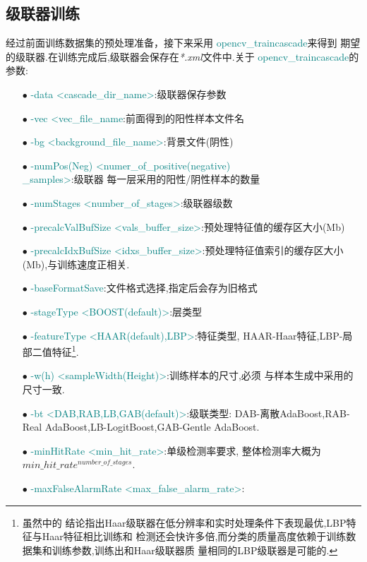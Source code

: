 \documentclass[10pt,technote]{IEEEtran}
\begin{document}
\subsection{级联器训练}
经过前面训练数据集的预处理准备，接下来采用
\textcolor{teal}{opencv\_traincascade}来得到
期望的级联器.在训练完成后,级联器会保存在\textit{*.xml}文件中.关于
\textcolor{teal}{opencv\_traincascade}的参数:
\begin{enumerate}
\item[$\bullet$]\textcolor{teal}{-data <cascade\_dir\_name>}:级联器保存参数
\item[$\bullet$]\textcolor{teal}{-vec <vec\_file\_name}:前面得到的阳性样本文件名
\item[$\bullet$]\textcolor{teal}{-bg <background\_file\_name>}:背景文件(阴性)
\item[$\bullet$]
\textcolor{teal}{-numPos(Neg) <numer\_of\_positive(negative)\\\_samples>}:级联器
每一层采用的阳性/阴性样本的数量
\item[$\bullet$]\textcolor{teal}{-numStages <number\_of\_stages>}:级联器级数
\item[$\bullet$]\textcolor{teal}{-precalcValBufSize <vals\_buffer\_size>}:预处理特征值的缓存区大小(Mb)
\item[$\bullet$]\textcolor{teal}{-precalcIdxBufSize <idxs\_buffer\_size>}:预处理特征值索引的缓存区大小(Mb),与训练速度正相关.
\item[$\bullet$]\textcolor{teal}{-baseFormatSave}:文件格式选择,指定后会存为旧格式
\item[$\bullet$]\textcolor{teal}{-stageType <BOOST(default)>}:层类型
\item[$\bullet$]\textcolor{teal}{-featureType <HAAR(default),LBP>}:特征类型,
HAAR-Haar特征,LBP\cite{bib6}-局部二值特征\footnote{虽然\cite{bib1}中的
结论指出Haar级联器在低分辨率和实时处理条件下表现最优,LBP特征与Haar特征相比训练和
检测还会快许多倍,而分类的质量高度依赖于训练数据集和训练参数,训练出和Haar级联器质
量相同的LBP级联器是可能的.}.
\item[$\bullet$]\textcolor{teal}{-w(h) <sampleWidth(Height)>}:训练样本的尺寸,必须
与样本生成中采用的尺寸一致.
\item[$\bullet$]\textcolor{teal}{-bt <{DAB,RAB,LB,GAB(default)}>}:级联类型:
DAB-离散AdaBoost,RAB-Real AdaBoost,LB-LogitBoost,GAB-Gentle AdaBoost.
\item[$\bullet$]\textcolor{teal}{-minHitRate <min\_hit\_rate>}:单级检测率要求,
整体检测率大概为$min\_hit\_rate^{number\_of\_stages}$.
\item[$\bullet$]\textcolor{teal}{-maxFalseAlarmRate <max\_false\_alarm\_rate>}:

\end{enumerate}
\end{document}
